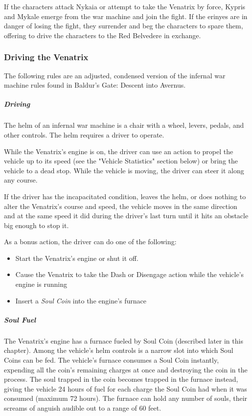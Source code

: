 \documentclass[10pt,a4paper,twoside,bg=print,twocolumn,openany,nodeprecatedcode]{dndbook}
\begin{document}
If the characters attack Nykaia or attempt to take the Venatrix by force, Kypris and Mykale emerge from the war machine and join the fight. If the erinyes are in danger of losing the fight, they surrender and beg the characters to spare them, offering to drive the characters to the Red Belvedere in exchange.

\subsubsection{Driving the Venatrix}
The following rules are an adjusted, condensed version of the infernal war machine rules found in Baldur's Gate: Descent into Avernus.

\subparagraph{Driving}
The helm of an infernal war machine is a chair with a wheel, levers, pedals, and other controls. The helm requires a driver to operate.

While the Venatrix's engine is on, the driver can use an action to propel the vehicle up to its speed (see the "Vehicle Statistics" section below) or bring the vehicle to a dead stop. While the vehicle is moving, the driver can steer it along any course.

If the driver has the incapacitated condition, leaves the helm, or does nothing to alter the Venatrix's course and speed, the vehicle moves in the same direction and at the same speed it did during the driver's last turn until it hits an obstacle big enough to stop it.

As a bonus action, the driver can do one of the following:


\begin{itemize}
\item Start the Venatrix's engine or shut it off.
\item Cause the Venatrix to take the Dash or Disengage action while the vehicle's engine is running
\item Insert a \textit{Soul Coin} into the engine's furnace
\end{itemize}

\subparagraph{Soul Fuel}
The Venatrix's engine has a furnace fueled by Soul Coin (described later in this chapter). Among the vehicle's helm controls is a narrow slot into which Soul Coins can be fed. The vehicle's furnace consumes a Soul Coin instantly, expending all the coin's remaining charges at once and destroying the coin in the process. The soul trapped in the coin becomes trapped in the furnace instead, giving the vehicle 24 hours of fuel for each charge the Soul Coin had when it was consumed (maximum 72 hours). The furnace can hold any number of souls, their screams of anguish audible out to a range of 60 feet.
\end{document}
